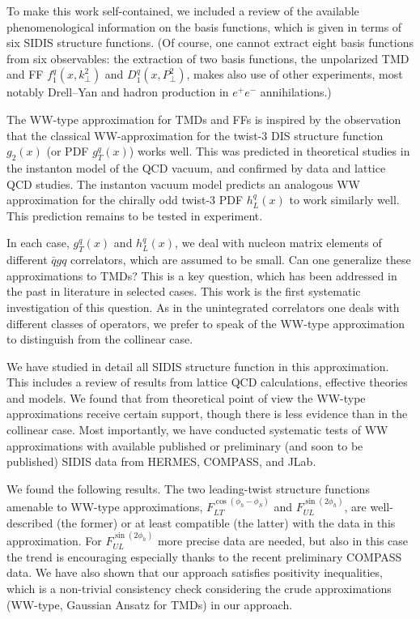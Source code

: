 \documentclass[a4paper,11pt]{article}
\def\kperp{k_\perp}
\def\pperp{P_\perp}
\begin{document}
To make this work self-contained, we included a review of the
available phenomenological information on the basis functions,
which is given in terms of six SIDIS structure functions.
(Of course, one cannot extract eight basis
functions from six observables: the extraction of two basis functions,
the unpolarized TMD and FF $f_1^q(x,\kperp^{2})$ and $D_1^q(x,\pperp^{2})$,
makes also use of other experiments, most notably Drell--Yan
and hadron production in $e^+e^-$ annihilations.)

The WW-type approximation for TMDs and FFs is inspired by the
observation that the classical WW-approximation for the twist-3
DIS structure function $g_2(x)$ (or PDF $g_T^q(x)$) works well.
This was predicted in theoretical studies in the instanton model
of the QCD vacuum, and confirmed by data and lattice QCD studies.
The instanton vacuum model predicts an analogous WW approximation
for the chirally odd twist-3 PDF $h_L^q(x)$ to work similarly
well. This prediction remains to be tested in experiment.

In each case, $g_T^q(x)$ and $h_L^q(x)$, we deal with nucleon
matrix elements of different $\bar{q}gq$ correlators, which are
assumed to be small. Can one generalize these approximations to
TMDs? This is a key question, which has been addressed in the
past in literature in selected cases. This work is the first
systematic investigation of this question.
As in the unintegrated correlators one deals with different
classes of operators, we prefer to speak of the
WW-type approximation to distinguish from the collinear case.

We have studied in detail all SIDIS structure function in
this approximation. This includes a review of results from
lattice QCD calculations, effective theories and models.
We found that from theoretical point of view the WW-type
approximations receive certain support, though there is
less evidence than in the collinear case.
Most importantly, we have conducted systematic tests of
WW approximations with available published or
preliminary (and soon to be published) SIDIS data
from HERMES, COMPASS, and JLab.

We found the following results. The two leading-twist
structure functions amenable to WW-type approximations,
	$F_{LT}^{\cos(\phi_h -\phi_S)}$ and
	$F_{UL}^{\sin(2\phi_h)}$,
are well-described (the former) or at least compatible
(the latter) with the data in this approximation. For
$F_{UL}^{\sin(2\phi_h)}$ more precise data are needed,
but also in this case the trend is encouraging
especially thanks to the recent preliminary COMPASS data.
We have also shown that our approach satisfies positivity
inequalities, which is a non-trivial consistency check
considering the crude approximations (WW-type, Gaussian
Ansatz for TMDs) in our approach.
\end{document}
